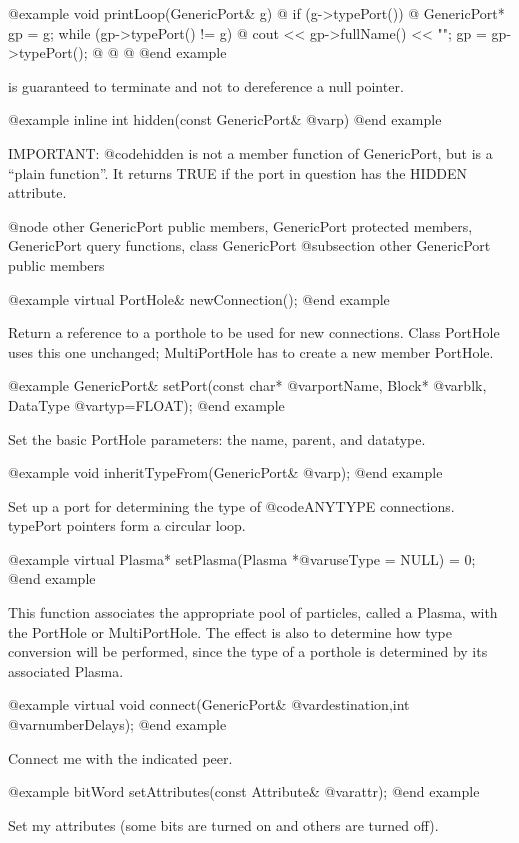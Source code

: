 @example
void printLoop(GenericPort& g) @{
        if (g->typePort()) @{
                GenericPort* gp = g;
                while (gp->typePort() != g) @{
                        cout << gp->fullName() << "\n";
                        gp = gp->typePort();
                @}
        @}
@}
@end example

is guaranteed to terminate and not to dereference a null pointer.

@example
inline int hidden(const GenericPort& @var{p})
@end example

IMPORTANT: @code{hidden} is not a member function of GenericPort,
but is a ``plain function''.  It returns TRUE if the port in question
has the HIDDEN attribute.

@node other GenericPort public members, GenericPort protected members, GenericPort query functions, class GenericPort
@subsection other GenericPort public members

@example
virtual PortHole& newConnection();
@end example

Return a reference to a porthole to be used for new connections.
Class PortHole uses this one unchanged; MultiPortHole has to create
a new member PortHole.

@example
GenericPort& setPort(const char* @var{portName}, Block* @var{blk}, DataType @var{typ}=FLOAT);
@end example

Set the basic PortHole parameters: the name, parent, and datatype.

@example
void inheritTypeFrom(GenericPort& @var{p});
@end example

Set up a port for determining the type of @code{ANYTYPE} connections.
typePort pointers form a circular loop.

@example
virtual Plasma* setPlasma(Plasma *@var{useType} = NULL) = 0;
@end example

This function associates the appropriate pool of particles, called a
Plasma, with the PortHole or MultiPortHole.  The effect is also to
determine how type conversion will be performed, since the type of
a porthole is determined by its associated Plasma.

@example
virtual void connect(GenericPort& @var{destination},int @var{numberDelays});
@end example

Connect me with the indicated peer.

@example
bitWord setAttributes(const Attribute& @var{attr});
@end example

Set my attributes (some bits are turned on and others are turned off).


